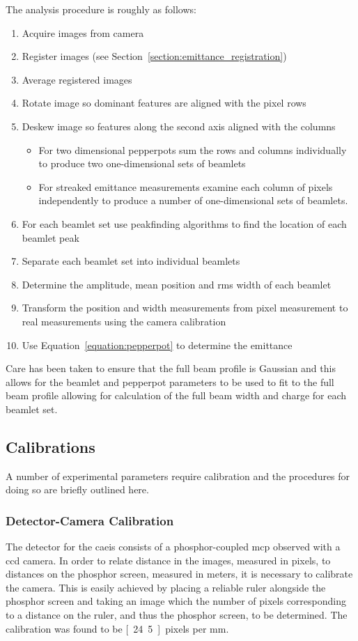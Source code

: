 The analysis procedure is roughly as follows:
\begin{enumerate}
    \item Acquire images from camera
    \item Register images (see Section~\ref{section:emittance_registration})
    \item Average registered images
    \item Rotate image so dominant features are aligned with the pixel rows
    \item Deskew image so features along the second axis aligned with the columns
    \begin{itemize}
        \item For two dimensional pepperpots sum the rows and columns individually to produce two one-dimensional sets of beamlets
        \item For streaked emittance measurements examine each column of pixels independently to produce a number of one-dimensional sets of beamlets.
    \end{itemize}
    \item For each beamlet set use peakfinding algorithms to find the location of each beamlet peak
    \item Separate each beamlet set into individual beamlets
    \item Determine the amplitude, mean position and \gls{rms} width of each beamlet
    \item Transform the position and width measurements from pixel measurement to real measurements using the camera calibration
    \item Use Equation~\ref{equation:pepperpot} to determine the emittance
\end{enumerate}

Care has been taken to ensure that the full beam profile is Gaussian and this allows for the beamlet and pepperpot parameters to be used to fit to the full beam profile allowing for calculation of the full beam width and charge for each beamlet set.

\subsection{Calibrations}
A number of experimental parameters require calibration and the procedures for doing so are briefly outlined here.

\subsubsection{Detector-Camera Calibration}
The detector for the \gls{caeis} consists of a phosphor-coupled \gls{mcp} observed with a \gls{ccd} camera.
In order to relate distance in the images, measured in pixels, to distances on the phosphor screen, measured in meters, it is necessary to calibrate the camera.
This is easily achieved by placing a reliable ruler alongside the phosphor screen and taking an image which the number of pixels corresponding to a distance on the ruler, and thus the phosphor screen, to be determined.
The calibration was found to be \unit[24.5]{pixels per mm}.

